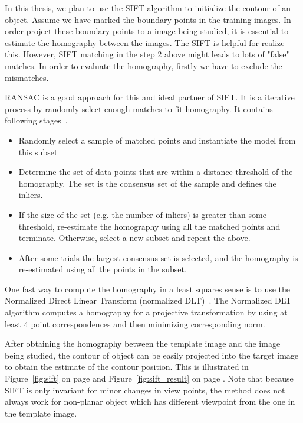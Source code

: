 In this thesis, we plan to use the SIFT algorithm to initialize the
contour of an object. Assume we have marked the boundary points in the
training images. In order project these boundary points to a image
being studied, it is essential to estimate the homography between the
images. The SIFT is helpful for realize this. However, SIFT matching
in the step 2 above might leads to lots of "false" matches. In order
to evaluate the homography, firstly we have to exclude the
mismatches. 

RANSAC is a good approach for this and ideal partner of SIFT. It is a
iterative process by randomly select enough matches to fit
homography. It contains following stages~\cite{fischler1981random}.
\begin{itemize}
\item  Randomly select a sample of matched points and instantiate the
  model from this subset
\item Determine the set of data points that are within a distance
  threshold of the homography. The set is the consensus set of the sample
  and defines the inliers.
\item If the size of the set (e.g. the number of inliers) is greater
  than some threshold, re-estimate the homography using all the matched
  points and terminate. Otherwise, select a new subset and repeat the
  above.
\item After some trials the largest consensus set is selected, and the
  homography is re-estimated using all the points in the subset.
\end{itemize}
One fast way to compute the homography in a least squares sense is to use the Normalized
Direct Linear Transform (normalized
DLT)~\cite{hartley2003multiple}. The Normalized DLT algorithm computes
a homography for a projective transformation by using at least 4 point
correspondences and then minimizing corresponding norm.

After obtaining the homography between the template image and the
image being studied, the contour of object can be easily projected
into the target image to obtain the estimate of the contour
position. This is illustrated in Figure~\ref{fig:sift} on page
\pageref{fig:sift} and Figure~\ref{fig:sift_result} on page
\pageref{fig:sift_result}. Note that because SIFT is only invariant for
minor changes in view points, the method does not always work for
non-planar object which has different viewpoint from the one in the
template image.

